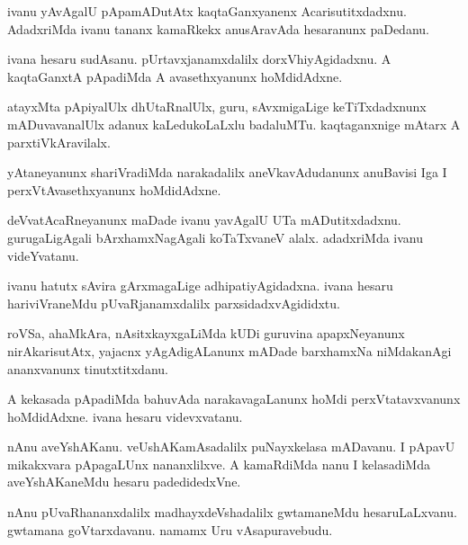 \documentclass{article}
\begin{document}
\begin{mn}%
ivanu yAvAgalU pApamADutAtx kaqtaGanxyanenx Acarisutitxdadxnu. AdadxriMda ivanu tananx 
kamaRkekx anusAravAda hesaranunx paDedanu.
\end{mn}

\begin{mn}%
ivana hesaru sudAsanu. pUrtavxjanamxdalilx dorxVhiyAgidadxnu. A kaqtaGanxtA pApadiMda A 
avasethxyanunx hoMdidAdxne.
\end{mn}

\begin{mn}%
atayxMta pApiyalUlx dhUtaRnalUlx, guru, sAvxmigaLige keTiTxdadxnunx mADuvavanalUlx adanux 
kaLedukoLaLxlu badaluMTu. kaqtaganxnige mAtarx A parxtiVkAravilalx.
\end{mn}

\begin{mn}%
yAtaneyanunx shariVradiMda narakadalilx aneVkavAdudanunx anuBavisi Iga I 
perxVtAvasethxyanunx hoMdidAdxne.
\end{mn}

\begin{mn}%
deVvatAcaRneyanunx maDade ivanu yavAgalU UTa mADutitxdadxnu. gurugaLigAgali 
bArxhamxNagAgali koTaTxvaneV alalx. adadxriMda ivanu videYvatanu.
\end{mn}

\begin{mn}%
ivanu hatutx sAvira gArxmagaLige adhipatiyAgidadxna. ivana hesaru hariviVraneMdu 
pUvaRjanamxdalilx parxsidadxvAgididxtu.
\end{mn}

\begin{mn}%
roVSa, ahaMkAra, nAsitxkayxgaLiMda kUDi guruvina apapxNeyanunx nirAkarisutAtx, yajacnx 
yAgAdigALanunx mADade barxhamxNa niMdakanAgi ananxvanunx tinutxtitxdanu.
\end{mn}

\begin{mn}%
A kekasada pApadiMda bahuvAda narakavagaLanunx hoMdi perxVtatavxvanunx hoMdidAdxne. ivana 
hesaru videvxvatanu.
\end{mn}

\begin{mn}%
nAnu aveYshAKanu. veUshAKamAsadalilx puNayxkelasa mADavanu. I pApavU mikakxvara pApagaLUnx 
nananxlilxve. A kamaRdiMda nanu I kelasadiMda aveYshAKaneMdu hesaru padedidedxVne.
\end{mn}

\begin{mn}%
nAnu pUvaRhananxdalilx madhayxdeVshadalilx gwtamaneMdu hesaruLaLxvanu. gwtamana 
goVtarxdavanu. namamx Uru vAsapuravebudu.
\end{mn}
\end{document}

